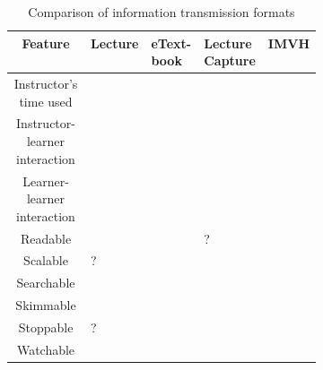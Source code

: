 \documentclass[12pt]{article}
\begin{document}

\begin{table}
	\caption{Comparison of information transmission formats} \label{tech_comparison}
	\centering
	\begin{tabular}{|c*{4}{|>{\centering\arraybackslash}m{0.1\linewidth}}|}
		\hline
		Feature & Lecture & eText-book & Lecture Capture & IMVH\\
		\hline
		Instructor's time used & \checkmark & & &\\
		Instructor-learner interaction & \checkmark & & &\\
		Learner-learner interaction & \checkmark & & & \\
		Readable & & \checkmark & ? & \checkmark \\
		Scalable & ? & \checkmark & \checkmark & \checkmark \\
		Searchable & & \checkmark & & \checkmark \\
		Skimmable & & \checkmark & & \checkmark \\
		Stoppable & ? & \checkmark & \checkmark & \checkmark \\
		Watchable & \checkmark & & \checkmark & \checkmark \\

		\hline

	\end{tabular}
	\label{infotransmission}
\end{table}
\end{document}
